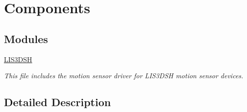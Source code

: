 \hypertarget{group__Components}{\section{Components}
\label{group__Components}
}
\subsection*{Modules}
\begin{DoxyCompactItemize}
\item 
\hyperlink{group__LIS3DSH}{L\-I\-S3\-D\-S\-H}
\begin{DoxyCompactList}\small\item\em This file includes the motion sensor driver for L\-I\-S3\-D\-S\-H motion sensor devices. \end{DoxyCompactList}\end{DoxyCompactItemize}


\subsection{Detailed Description}
